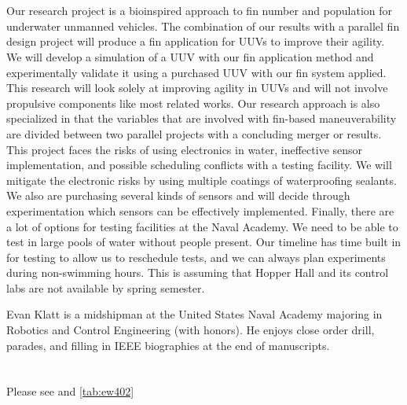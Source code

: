 \documentclass{IEEEtran}
\begin{document}
\section{}
Our research project is a bioinspired approach to fin number and population for underwater unmanned vehicles. The combination of our results with a parallel fin design project will produce a fin application for UUVs to improve their agility. We will develop a simulation of a UUV with our fin application method and experimentally validate it using a purchased UUV with our fin system applied. This research will look solely at improving agility in UUVs and will not involve propulsive components like most related works. Our research approach is also specialized in that the variables that are involved with fin-based maneuverability are divided between two parallel projects with a concluding merger or results. This project faces the risks of using electronics in water, ineffective sensor implementation, and possible scheduling conflicts with a testing facility. We will mitigate the electronic risks by using multiple coatings of waterproofing sealants. We also are purchasing several kinds of sensors and will decide through experimentation which sensors can be effectively implemented. Finally, there are a lot of options for testing facilities at the Naval Academy. We need to be able to test in large pools of water without people present. Our timeline has time built in for testing to allow us to reschedule tests, and we can always plan experiments during non-swimming hours. This is assuming that Hopper Hall and its control labs are not available by spring semester.

\nocite{xu2007initial, tangorra2006biorobotic, su2010experimental, geder2013maneuvering, zhou2009dynamics}

\begin{IEEEbiography}{Evan Klatt} is a midshipman at the United States Naval Academy majoring in Robotics and Control Engineering (with honors). He enjoys close order drill, parades, and filling in IEEE biographies at the end of manuscripts.  
\end{IEEEbiography}


\appendices
\section{}
\label{app:A}
Please see  and \ref{tab:ew402}
\end{document}
